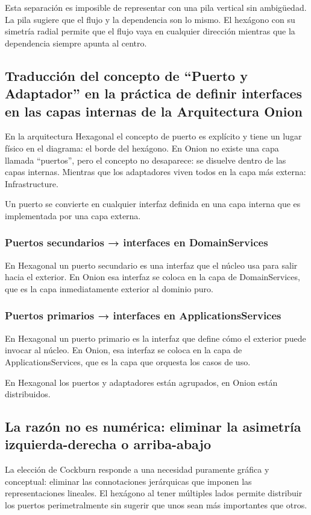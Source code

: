 \documentclass[12pt, a4paper]{article}
\begin{document}
        Esta separación es imposible de representar con una pila vertical sin ambigüedad. La pila sugiere que el flujo y la dependencia son lo mismo. El hexágono con su simetría radial permite que el flujo vaya en cualquier dirección mientras que la dependencia siempre apunta al centro.

        \subsection{Traducción del concepto de ``Puerto y Adaptador'' en la práctica de definir interfaces en las capas internas de la Arquitectura Onion}
        En la arquitectura Hexagonal el concepto de puerto es explícito y tiene un lugar físico en el diagrama: el borde del hexágono. En Onion no existe una capa llamada ``puertos'', pero el concepto no desaparece: se disuelve dentro de las capas internas. Mientras que los adaptadores viven todos en la capa más externa: Infrastructure.

        Un puerto se convierte en cualquier interfaz definida en una capa interna que es implementada por una capa externa.

        \subsubsection*{Puertos secundarios → interfaces en DomainServices}
        En Hexagonal un puerto secundario es una interfaz que el núcleo usa para salir hacia el exterior. En Onion esa interfaz se coloca en la capa de DomainServices, que es la capa inmediatamente exterior al dominio puro.

        \subsubsection*{Puertos primarios → interfaces en ApplicationsServices}
        En Hexagonal un puerto primario es la interfaz que define cómo el exterior puede invocar al núcleo. En Onion, esa interfaz se coloca en la capa de ApplicationsServices, que es la capa que orquesta los casos de uso.

        En Hexagonal los puertos y adaptadores están agrupados, en Onion están distribuidos.

        \subsection{La razón no es numérica: eliminar la asimetría izquierda-derecha o arriba-abajo}
        La elección de Cockburn responde a una necesidad puramente gráfica y conceptual: eliminar las connotaciones jerárquicas que imponen las representaciones lineales. El hexágono al tener múltiples lados permite distribuir los puertos perimetralmente sin sugerir que unos sean más importantes que otros.
\end{document}
